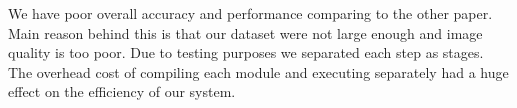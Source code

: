 We have poor overall accuracy and performance comparing to the other paper. Main reason behind this is that our dataset were not large enough and image quality is too poor. Due to testing purposes we separated each step as stages. The overhead cost of compiling each module and executing separately had a huge effect on the efficiency of our system. 
